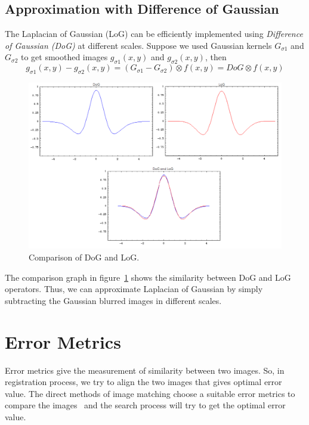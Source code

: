 \subsection{Approximation with Difference of Gaussian}
The Laplacian of Gaussian (LoG) can be efficiently implemented using \emph{Difference of Gaussian (DoG)} at different scales. Suppose we used Gaussian kernels $G_{\sigma1}$ and $G_{\sigma2}$ to get smoothed images $g_{\sigma1}(x,y)$ and $g_{\sigma2}(x,y)$, then
\begin{equation}
g_{\sigma1}(x,y)-g_{\sigma2}(x,y)= (G_{\sigma1}-G_{\sigma2}) \otimes f(x,y)=DoG \otimes f(x,y)
\label{eq:DoG}
\end{equation}
\begin{figure}%
\centering
\includegraphics[width=1.0\columnwidth]{2.mainmatter/1.Introduction/figures/DoG-Log}%
\caption[Comparison of DoG and LoG]{Comparison of DoG and LoG. \newline \quad {}}%
\label{fig:DoG-LoG}%
\end{figure}
\noindent The comparison graph in figure~\ref{fig:DoG-LoG} shows the similarity between DoG and LoG operators. Thus, we can approximate Laplacian of Gaussian by simply subtracting the Gaussian blurred images in different scales. 

\section{Error Metrics}
Error metrics give the measurement of similarity between two images. So, in registration process, we try to align the two images that gives optimal error value. The direct methods of image matching choose a suitable error metrics to compare the images~\cite{Szeliski:06} and the search process will try to get the optimal error value. 
